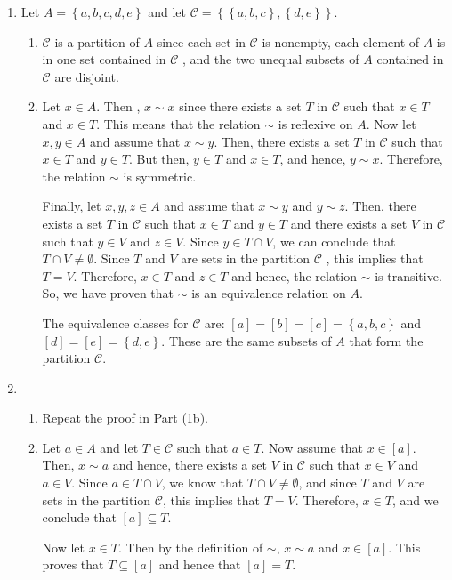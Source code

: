\documentclass[11pt]{article}
\begin{document}
\begin{enumerate} 
\item Let  $A = \left\{ {a, b, c, d, e} \right\}$ and let  
$\mathcal{C} = \left\{ {\left\{ {a, b, c} \right\}, \left\{ {d, e} \right\}} \right\}$. 

\begin{enumerate}
\item $\mathcal{C}$ is a partition of $A$  since each set in  $\mathcal{C}$  is nonempty, each element of  $A$  is in one set contained in  $\mathcal{C}$ , and the two unequal subsets  of  $A$  contained in  $\mathcal{C}$  are disjoint.

\item Let  $x \in A$.  Then ,  $x \sim x$ since there exists a set  $T$  in  $\mathcal{C}$  such that  $x \in T$ and  $x \in T$.  This means that the relation  $\sim$  is reflexive on  $A$.
\vskip6pt
Now let  $x, y \in A$ and assume that  $x \sim y$.  Then, there exists a set  $T$  in  
$\mathcal{C}$  such that  $x \in T$ and  $y \in T$.  But then,  $y \in T$ and  $x \in T$, and hence,  $y \sim x$.  Therefore, the relation  $\sim$  is symmetric.
\vskip6pt

Finally, let  $x, y, z \in A$  and assume that  $x \sim y$  and  $y \sim z$.  Then, there exists a set  $T$  in  $\mathcal{C}$  such that  $x \in T$ and  $y \in T$  and  there exists a set  $V$  in  $\mathcal{C}$  such that  $y \in V$ and  $z \in V$.  Since  $y \in T \cap V$, we can conclude that  $T \cap V \ne \emptyset $.  Since  $T$  and  $V$  are sets in the partition  $\mathcal{C}$ , this implies that  $T = V$.  Therefore,  $x \in T$ and  $z \in T$ and hence, the relation  $\sim$  is transitive. So, we have proven that  $\sim$  is an equivalence relation on  $A$.
\vskip6pt

The equivalence classes for $\mathcal{C}$ are:  $\left[ a \right] = \left[ b \right] = \left[ c \right] = \left\{ {a, b, c} \right\}$  and   
$\left[ d \right] = \left[ e \right] = \left\{ {d, e} \right\}$.  These are the same subsets of 
$A$ that form the partition $\mathcal{C}$.
\end{enumerate}

\item \begin{enumerate}
\item Repeat the proof in Part (1b).

\item Let  $a \in A$  and let  $T \in \mathcal{C}$ such that  $a \in T$.  Now assume that  
$x \in \left[ a \right]$.  Then,  $x \sim a$ and hence,  there exists a set  $V$  in  
$\mathcal{C}$  such that  $x \in V$ and  $a \in V$.  Since  $a \in T \cap V$, we know that  
$T \cap V \ne \emptyset $, and  since  $T$  and  $V$  are sets in the partition  $\mathcal{C}$, this implies that  $T = V$.   Therefore, $x \in T$, and we conclude that  
$\left[ a \right] \subseteq T$.

Now let  $x \in T$.  Then by the definition of  $\sim$,  $x \sim a$ and  
$x \in \left[ a \right]$.  This proves that  $T \subseteq \left[ a \right]$ and hence that  
$\left[ a \right] = T$.
\end{enumerate}
\end{enumerate}
\end{document}
